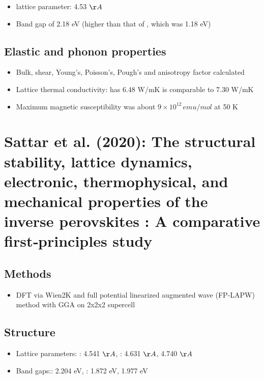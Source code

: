 \documentclass[10pt,a4paper, titlepage]{article}
\begin{document}
\begin{itemize}
  \item {} lattice parameter: 4.53 $\AA$
  \item Band gap of 2.18 eV (higher than that of , which was 1.18 eV)
\end{itemize}

\subsection{Elastic and phonon properties}

\begin{itemize}
  \item Bulk, shear, Young's, Poisson's, Pough's and anisotropy factor calculated
  \item Lattice thermal conductivity:  has 6.48 W/mK is comparable to  7.30 W/mK
  \item Maximum magnetic susceptibility was  about $9 \times 10^{12} \, emu/mol$ at 50 K
\end{itemize}

\section{Sattar et al. (2020): The structural stability, lattice dynamics, electronic, thermophysical, and mechanical properties of the inverse perovskites : A comparative first‐principles study}

\subsection{Methods}

\begin{itemize}
  \item DFT via Wien2K and full potential linearized augmented wave (FP‐LAPW) method with GGA on 2x2x2 supercell
\end{itemize}

\subsection{Structure}

\begin{itemize}
  \item Lattice parameters: : 4.541 $\AA$, : 4.631 $\AA$,  4.740 $\AA$
  \item Band gaps:: 2.204 eV, : 1.872 eV,  1.977 eV
\end{itemize}
\end{document}
